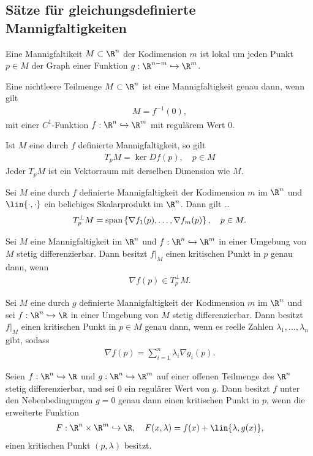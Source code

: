 \subsection{Sätze für gleichungsdefinierte Mannigfaltigkeiten}
\begin{prop}
Eine Mannigfaltikeit $M\subset\R^n$ der Kodimension $m$ ist lokal um jeden Punkt
$p\in M$ der Graph einer Funktion $g: \R^{n-m}\hookrightarrow\R^m$.
\end{prop}
\begin{prop}
Eine nichtleere Teilmenge $M\subset\R^n$ ist eine Mannigfaltigkeit genau dann,
wenn gilt
\begin{align*}
M = f^{-1}(0),
\end{align*}
mit einer $C^1$-Funktion $f:\R^n\hookrightarrow\R^m$ mit regulärem Wert $0$. 
\end{prop}
\begin{prop}
Ist $M$ eine durch $f$ definierte Mannigfaltigkeit, so gilt
\begin{align*}
T_pM = \ker Df(p),\quad p\in M
\end{align*}
Jeder $T_pM$ ist ein Vektorraum mit derselben Dimension wie $M$.
\end{prop}
\begin{prop}
Sei $M$ eine durch $f$ definierte Mannigfaltigkeit der Kodimension $m$ im $\R^n$
und $\lin{\cdot,\cdot}$ ein beliebiges Skalarprodukt im $\R^n$. Dann gilt \ldots
\begin{align*}
T_p^\bot M = \sp{\nabla f_1(p), \ldots, \nabla f_m(p)},\quad p\in M.
\end{align*}
\end{prop}

\begin{prop}
Sei $M$ eine Mannigfaltigkeit im $\R^n$ und $f:\R^n\hookrightarrow\R^m$ in
einer Umgebung von $M$ stetig differenzierbar. Dann besitzt $f\big|_M$ einen kritischen Punkt in $p$
genau dann, wenn
\begin{align*}
\nabla f(p) \in T_p^\bot M.
\end{align*}
\end{prop}
\begin{prop}
Sei $M$ eine durch $g$ definierte Mannigfaltigkeit der Kodimension $m$ im
$\R^n$ und sei $f: \R^n\hookrightarrow\R$ in einer Umgebung von $M$ stetig
differenzierbar. Dann besitzt $f|_M$ einen kritischen Punkt in $p\in M$ genau
dann, wenn es reelle Zahlen $\lambda_1,\ldots,\lambda_n$ gibt, sodass
\begin{align*}
\nabla f(p) = \sum\limits_{i=1}^n \lambda_i \nabla g_i(p).
\end{align*}
\end{prop}
\begin{prop}
Seien $f:\R^n\hookrightarrow\R$ und $g:\R^n\hookrightarrow\R^m$ auf einer
offenen Teilmenge des $\R^n$ stetig differenzierbar, und sei $0$ ein regulärer
Wert von $g$. Dann besitzt $f$ unter den Nebenbedingungen $g = 0$ genau dann
einen kritischen Punkt in $p$, wenn die erweiterte Funktion
\begin{align*}
F: \R^n\times \R^m \hookrightarrow\R,\quad F(x,\lambda) = f(x) +
\lin{\lambda,g(x)},
\end{align*}
einen kritischen Punkt $(p,\lambda)$ besitzt.
\end{prop}